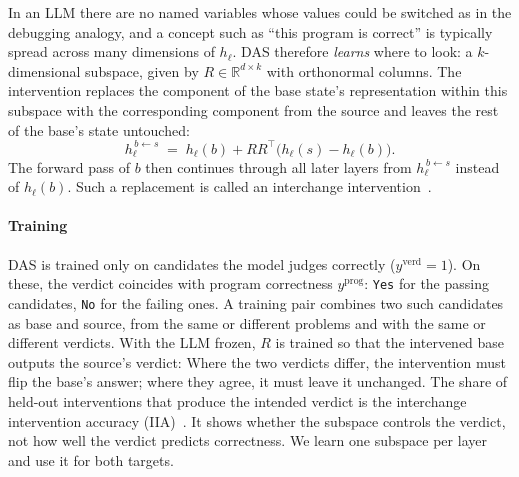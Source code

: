 In an LLM there are no named variables whose values could be switched as in the debugging analogy, and a concept such as ``this program is correct'' is typically spread across many dimensions of $h_\ell$. 
DAS therefore \emph{learns} where to look: a $k$-dimensional subspace, given by $R \in \mathbb{R}^{d \times k}$ with orthonormal columns. 
The intervention replaces the  component of the base state's representation within this subspace with the corresponding component from the source
and leaves the rest of the base's state untouched:
\begin{equation}
  h_\ell^{\,b\leftarrow s} \;=\; h_\ell(b) + R R^{\top}\bigl(h_\ell(s) - h_\ell(b)\bigr).
\end{equation}
The forward pass of $b$ then continues through all later layers from
$h_\ell^{\,b\leftarrow s}$ instead of $h_\ell(b)$. Such a replacement is
called an interchange intervention~\cite{Geiger2021CausalAbstractions}.

\paragraph{Training}
DAS is trained only on candidates the model judges correctly ($y^{\mathrm{verd}}{=}1$). 
On these, the verdict coincides with program correctness $y^{\mathrm{prog}}$: \texttt{Yes} for the passing
candidates, \texttt{No} for the failing ones. 
A training pair combines two such candidates as base and source, from the same or different problems and with the same or different verdicts. 
With the LLM frozen, $R$ is trained so that the intervened base outputs the source's verdict: Where the two verdicts differ, the intervention must flip the base's answer; where they agree, it
must leave it unchanged. The share of held-out interventions that produce the
intended verdict is the interchange intervention accuracy (IIA)~\cite{GeigerWPIG24DAS}. 
It shows whether the subspace controls the verdict, not how well the verdict predicts correctness. We learn one subspace per layer and use it for both targets.

